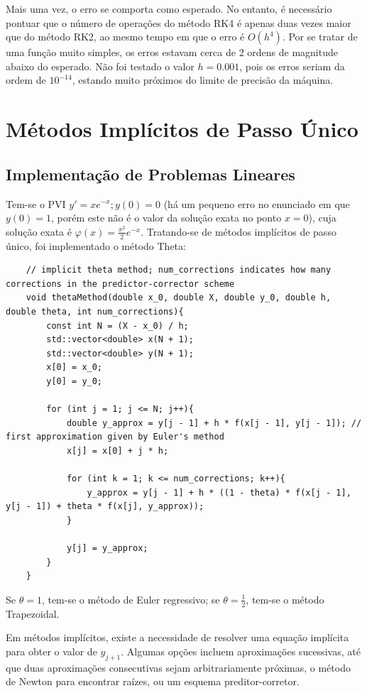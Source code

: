 \documentclass[10pt,a4paper]{article}
\begin{document}
\FloatBarrier

Mais uma vez, o erro se comporta como esperado. No entanto, é necessário pontuar que o número de operações do método RK4 é apenas duas vezes maior que do método RK2, ao mesmo tempo em que o erro é $O(h^4)$. Por se tratar de uma função muito simples, os erros estavam cerca de 2 ordens de magnitude abaixo do esperado. Não foi testado o valor $h = 0.001$, pois os erros seriam da ordem de $10^{-14}$, estando muito próximos do limite de precisão da máquina.



\section{Métodos Implícitos de Passo Único}\label{sec:introducao}

\subsection{Implementação de Problemas Lineares}

Tem-se o PVI $y' = x e^{-x}; y(0) = 0$ (há um pequeno erro no enunciado em que $y(0) = 1$, porém este não é o valor da solução exata no ponto $x = 0$), cuja solução exata é $\varphi(x) = \frac{x^2}{2} e^{-x}$. Tratando-se de métodos implícitos de passo único, foi implementado o método Theta:

\begin{lstlisting}
	// implicit theta method; num_corrections indicates how many corrections in the predictor-corrector scheme
	void thetaMethod(double x_0, double X, double y_0, double h, double theta, int num_corrections){
		const int N = (X - x_0) / h;
		std::vector<double> x(N + 1);
		std::vector<double> y(N + 1);
		x[0] = x_0;
		y[0] = y_0;

		for (int j = 1; j <= N; j++){
			double y_approx = y[j - 1] + h * f(x[j - 1], y[j - 1]); // first approximation given by Euler's method
			x[j] = x[0] + j * h;

			for (int k = 1; k <= num_corrections; k++){
				y_approx = y[j - 1] + h * ((1 - theta) * f(x[j - 1], y[j - 1]) + theta * f(x[j], y_approx));
			}

			y[j] = y_approx;
		}
	}
\end{lstlisting}
Se $\theta = 1$, tem-se o método de Euler regressivo; se $\theta = \frac{1}{2}$, tem-se o método Trapezoidal.

Em métodos implícitos, existe a necessidade de resolver uma equação implícita para obter o valor de $y_{j + 1}$. Algumas opções incluem aproximações sucessivas, até que duas aproximações consecutivas sejam arbitrariamente próximas, o método de Newton para encontrar raízes, ou um esquema preditor-corretor.
\end{document}
